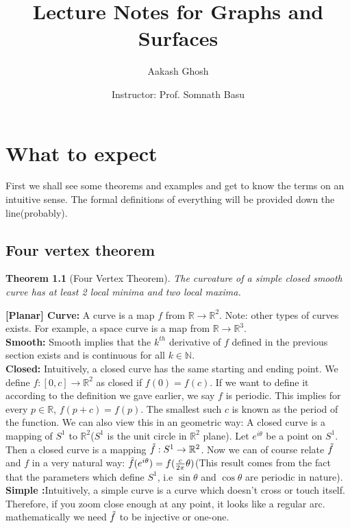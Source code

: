 \documentclass[oneside]{book}\twocolumn
\title{Lecture Notes for Graphs and Surfaces}
\author{Aakash Ghosh }
\date{Instructor: Prof. Somnath Basu}
\newtheorem{theorem}{Theorem}
\begin{document}
\maketitle
\tableofcontents


\chapter{What to expect}
First we shall see some theorems and examples and get to know the terms on an intuitive sense. The formal definitions of everything will be provided down the line(probably).
\section{Four vertex theorem}
\begin{theorem}[Four Vertex Theorem]
The curvature of a simple closed smooth curve has at least 2 local minima and two local maxima.
\end{theorem}
\textbf{[Planar] Curve:} A curve is a map $f$ from $\mathbb R\to\mathbb R^2$. Note: other types of curves exists. For example, a space curve is a map from $\mathbb R\to\mathbb R^3$.\\
\textbf{Smooth:} Smooth implies that the $k^{th}$ derivative of $f$ defined in the previous section exists and is continuous for all $k\in\mathbb N$.\\
\textbf{Closed:} Intuitively, a closed curve has the same starting and ending point. We define $f:[0,c]\to\mathbb R^2$ as closed if $f(0)=f(c)$. If we want to define it according to the definition we gave earlier, we say $f$ is periodic. This implies for every $p\in\mathbb R$, $f(p+c)=f(p)$. The smallest such $c$ is known as the period of the function. We can also view this in an geometric way: A closed curve is a mapping of $S^1$ to $\mathbb R^2$($S^1$ is the unit circle in $\mathbb R^2$ plane). Let $e^{i\theta}$ be a point on $S^1$. Then a closed curve is a mapping $\Tilde{f}:S^1\to \mathbb{R}^2$. Now we can of course relate $\Tilde{f}$ and $f$ in a very natural way: $\Tilde{f}(e^{i\theta})=f(\frac{c}{2\pi}\theta)$(This result comes from the fact that the parameters which define $S^1$, i.e $\sin\theta$ and $\cos\theta$ are periodic in nature).\\
\textbf{Simple :}Intuitively, a simple curve is a curve which doesn't cross or touch itself. Therefore, if you zoom close enough at any point, it looks like a regular arc. mathematically we need $\Tilde{f}$ to be injective or one-one.


\end{document}
